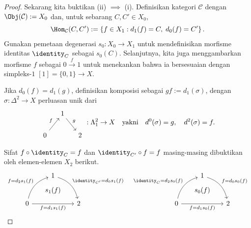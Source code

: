 \begin{proof}
	Sekarang kita buktikan (ii) $\implies$ (i). Definisikan kategori $\mathcal{C}$
	dengan $\Obj(\mathcal{C}):=X_0$ dan, untuk sebarang $C,C'\in X_0$,
	\[ \Hom_{\mathcal{C}}(C, C') := \left\{ f \in X_1: d_1(f) = C, \; d_0(f) = C' \right\}. \]
	Gunakan pemetaan degenerasi $s_0:X_0\to X_1$ untuk mendefinisikan morfisme
	identitas $\identity_C$ sebagai $s_0(C)$. Selanjutnya, kita juga
	menggambarkan morfisme $f$ sebagai $0\xrightarrow{f}1$ untuk menekankan
	bahwa ia bersesuaian dengan simpleks-$1$ $[1]=\{0,1\}\to X$.

	Jika $d_0(f)=d_1(g)$, definisikan komposisi sebagai
	$gf:=d_1(\sigma)$, dengan $\sigma:\Delta^2\to X$ perluasan unik dari
	\[\begin{tikzcd}[column sep=small]
		& 1 \arrow[rd, "g"] & \\
		0 \arrow[ru, "f"] & & 2
	\end{tikzcd}: \Lambda^2_1 \to X
	\quad \text{yakni}\quad d^0(\sigma) = g, \quad d^2(\sigma) = f. \]

	Sifat $f\circ\identity_C=f$ dan $\identity_{C'}\circ f=f$ masing-masing
	dibuktikan oleh elemen-elemen $X_2$ berikut.
	\[ \begin{tikzcd}[row sep=large]
		& 1 \arrow[rd, bend left, "{\identity_{C'} = d_0 s_1(f)}"] & \\
		0 \arrow[rr, "{}" name=A, "{f = d_1 s_1(f)}"'] \arrow[ru, bend left, "{f = d_2 s_1(f)}"] & & 2 \arrow[phantom, from=1-2, to=A, "{s_1(f)}" description]
	\end{tikzcd} \quad \begin{tikzcd}[row sep=large]
		& 1 \arrow[rd, bend left, "{f = d_0 s_0(f)}"] & \\
		0 \arrow[rr, "{}" name=A, "{f = d_1 s_0(f)}"'] \arrow[ru, bend left, "{\identity_C = d_2 s_0(f)}"] & & 2 \arrow[phantom, from=1-2, to=A, "{s_0(f)}" description]
	\end{tikzcd}\]


\end{proof}
